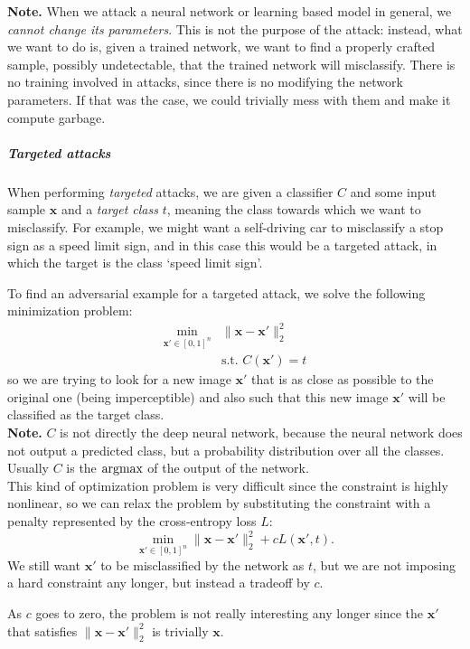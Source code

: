\textbf{Note.} When we attack a neural network or learning based model in general, we \emph{cannot change its parameters}. This is not the purpose of the attack: instead, what we want to do is, given a trained network, we want to find a properly crafted sample, possibly undetectable, that the trained network will misclassify. There is no training involved in attacks, since there is no modifying the network parameters. If that was the case, we could trivially mess with them and make it compute garbage.

\subparagraph{Targeted attacks}
When performing \emph{targeted} attacks, we are given a classifier $C$ and some input sample $\mathbf{x}$ and a \emph{target class} $t$, meaning the class towards which we want to misclassify. For example, we might want a self-driving car to misclassify a stop sign as a speed limit sign, and in this case this would be a targeted attack, in which the target is the class `speed limit sign'. 

To find an adversarial example for a targeted attack, we solve the following minimization problem:
\begin{align}
	\min_{\mathbf{x'} \in [0,1]^n}& \|\mathbf{x} - \mathbf{x'}\|^2_2 \\
	&\text{s.t. } C(\mathbf{x'}) = t
\end{align}
so we are trying to look for a new image $\mathbf{x'}$ that is as close as possible to the original one (being imperceptible) and also such that this new image $\mathbf{x'}$ will be classified as the target class. 
\\

\textbf{Note.} $C$ is not directly the deep neural network, because the neural network does not output a predicted class, but a probability distribution over all the classes. Usually $C$ is the $\operatorname*{\operatorname{argmax}}$ of the output of the network.
\\

This kind of optimization problem is very difficult since the constraint is highly nonlinear, so we can relax the problem by substituting the constraint with a penalty represented by the cross-entropy loss $L$:
\begin{equation}
	\min_{\mathbf{x'} \in [0,1]^n} \|\mathbf{x} - \mathbf{x'}\|^2_2 + cL(\mathbf{x'}, t).
\end{equation}
We still want $\mathbf{x'}$ to be misclassified by the network as $t$, but we are not imposing a hard constraint any longer, but instead a tradeoff by $c$.

As $c$ goes to zero, the problem is not really interesting any longer since the $\mathbf{x'}$ that satisfies $\|\mathbf{x} - \mathbf{x'}\|^2_2$ is trivially $\mathbf{x}$. 

